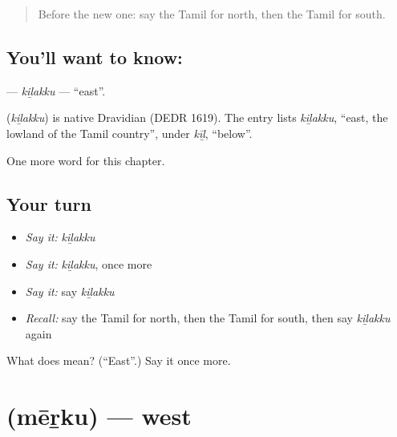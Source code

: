 \label{lesson:TA-C235-kilakku}



\begin{quote}
Before the new one: say the Tamil for north, then the Tamil for south.
\end{quote}

\subsection*{You'll want to know: }
\textbf{} — \emph{kiḻakku} — \textquotedblleft{}east\textquotedblright{}.

\begin{cousinweb}
\textbf{} (\emph{kiḻakku}) is native Dravidian (DEDR 1619). The entry lists \emph{kiḻakku}, \textquotedblleft{}east, the lowland of the Tamil country\textquotedblright{}, under \emph{kīḻ}, \textquotedblleft{}below\textquotedblright{}.
\end{cousinweb}

\begin{grammarlens}[title={What you've built}]
One more word for this chapter.
\end{grammarlens}

\subsection*{Your turn}
\begin{itemize}
\raggedright
  \item \emph{Say it:} \emph{kiḻakku}
  \item \emph{Say it:} \emph{kiḻakku}, once more
  \item \emph{Say it:} say \emph{kiḻakku}
  \item \emph{Recall:} say the Tamil for north, then the Tamil for south, then say \emph{kiḻakku} again
\end{itemize}

\begin{tcolorbox}[breakable,colback=teal!4,colframe=teal!35!black,title={Before you move on}]
What does  mean? (\textquotedblleft{}East\textquotedblright{}.) Say it once more.
\end{tcolorbox}
\section[\texorpdfstring{\ta{மேற்கு} (mēṟku)}{மேற்கு (mēṟku)}]{ (mēṟku) — west}


